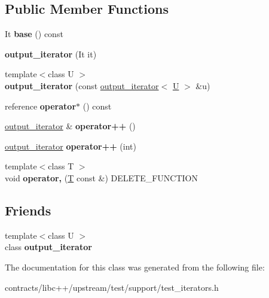 \subsection*{Public Member Functions}
\begin{DoxyCompactItemize}
\item 
\mbox{\label{classoutput__iterator_ab7bb49ce95a92386391143ddfe9c8542}} 
It {\bfseries base} () const
\item 
\mbox{\label{classoutput__iterator_a44668f9e7790b5466cdf97441465cd9e}} 
{\bfseries output\+\_\+iterator} (It it)
\item 
\mbox{\label{classoutput__iterator_af04e83a02aa4b9b4b600b83cc8d4301a}} 
{\footnotesize template$<$class U $>$ }\\{\bfseries output\+\_\+iterator} (const \mbox{\hyperlink{classoutput__iterator}{output\+\_\+iterator}}$<$ \mbox{\hyperlink{union_u}{U}} $>$ \&u)
\item 
\mbox{\label{classoutput__iterator_a0296a02633ece1da7b830899bb9fef56}} 
reference {\bfseries operator$\ast$} () const
\item 
\mbox{\label{classoutput__iterator_a90f83b8fd5a1ef158b28adda48d33c7e}} 
\mbox{\hyperlink{classoutput__iterator}{output\+\_\+iterator}} \& {\bfseries operator++} ()
\item 
\mbox{\label{classoutput__iterator_a31b2d1c1917032b4fea0e08ab04ab91f}} 
\mbox{\hyperlink{classoutput__iterator}{output\+\_\+iterator}} {\bfseries operator++} (int)
\item 
\mbox{\label{classoutput__iterator_ae0088c17957b647b5fdab8d8289d4f75}} 
{\footnotesize template$<$class T $>$ }\\void {\bfseries operator,} (\mbox{\hyperlink{struct_t}{T}} const \&) D\+E\+L\+E\+T\+E\+\_\+\+F\+U\+N\+C\+T\+I\+ON
\end{DoxyCompactItemize}
\subsection*{Friends}
\begin{DoxyCompactItemize}
\item 
\mbox{\label{classoutput__iterator_a04d28cc8649cc8f3f5c47d6cb94c5c3d}} 
{\footnotesize template$<$class U $>$ }\\class {\bfseries output\+\_\+iterator}
\end{DoxyCompactItemize}


The documentation for this class was generated from the following file\+:\begin{DoxyCompactItemize}
\item 
contracts/libc++/upstream/test/support/test\+\_\+iterators.\+h\end{DoxyCompactItemize}
